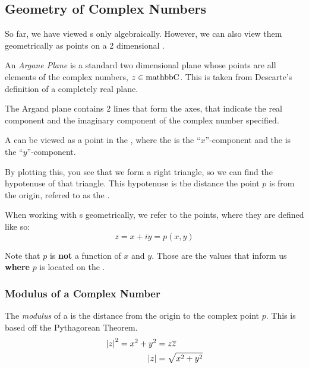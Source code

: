 \subsection{Geometry of Complex Numbers}\label{subsec:Geometry_Complex_Numbers}
So far, we have viewed s only algebraically.
However, we can also view them geometrically as points on a 2 dimensional .

\begin{definition}\label{def:Argand_Plane}
  An \emph{Argane Plane} is a standard two dimensional plane whose points are all elements of the complex numbers, $z \in \operatorname{mathbb{C}}$.
  This is taken from Descarte's definition of a completely real plane.

  The Argand plane contains 2 lines that form the axes, that indicate the real component and the imaginary component of the complex number specified.
\end{definition}

A  can be viewed as a point in the , where the  is the ``$x$''-component and the  is the ``$y$''-component.

By plotting this, you see that we form a right triangle, so we can find the hypotenuse of that triangle.
This hypotenuse is the distance the point $p$ is from the origin, refered to as the .
\begin{remark*}
  When working with s geometrically, we refer to the points, where they are defined like so:
  \begin{equation*}
    z = x + iy = p(x, y)
  \end{equation*}

  Note that $p$ is \textbf{not} a function of $x$ and $y$.
  Those are the values that inform us \textbf{where} $p$ is located on the .
\end{remark*}

\subsubsection{Modulus of a Complex Number}\label{subsubsec:Complex_Number_Modulus}
\begin{definition}[Modulus]\label{def:Complex_Number_Modulus}
  The \emph{modulus} of a  is the distance from the origin to the complex point $p$.
  This is based off the Pythagorean Theorem.
  \begin{equation}\label{eq:Complex_Number_Modulus}
    \begin{aligned}
      {\lvert z \rvert}^{2} = x^{2} + y^{2} &= z \overline{z} \\
      \lvert z \rvert &= \sqrt{x^{2} + y^{2}}
    \end{aligned}
  \end{equation}
\end{definition}

